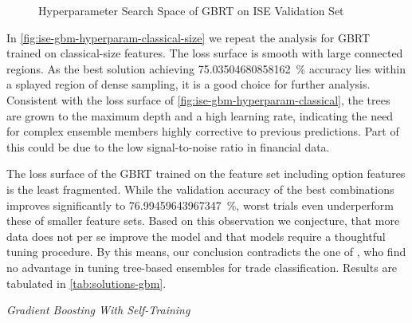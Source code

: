 \begin{figure}[!b]
    \vfill
\end{figure}
\clearpage
\begin{figure}[ht]
    \addtocounter{figure}{-1}
    \caption[]{Hyperparameter Search Space of \gls{GBRT} on \gls{ISE} Validation Set}
    \label{fig:ise-gbm-hyperparam}
\end{figure}

In \cref{fig:ise-gbm-hyperparam-classical-size} we repeat the analysis for \gls{GBRT} trained on classical-size features. The loss surface is smooth with large connected regions. As the best solution achieving \SI{75.03504680858162}{\percent} accuracy lies within a splayed region of dense sampling, it is a good choice for further analysis. Consistent with the loss surface of \cref{fig:ise-gbm-hyperparam-classical}, the trees are grown to the maximum depth and a high learning rate, indicating the need for complex ensemble members highly corrective to previous predictions. Part of this could be due to the low signal-to-noise ratio in financial data.

The loss surface of the \gls{GBRT} trained on the feature set including option features is the least fragmented. While the validation accuracy of the best combinations improves significantly to \SI{76.99459643967347}{\percent}, worst trials even underperform these of smaller feature sets. Based on this observation we conjecture, that more data does not per se improve the model and that models require a thoughtful tuning procedure. By this means, our conclusion contradicts the one of \textcite[][14]{ronenMachineLearningTrade2022}, who find no advantage in tuning tree-based ensembles for trade classification. Results are tabulated in \cref{tab:solutions-gbm}.

\clearpage

\emph{Gradient Boosting With Self-Training}

\begin{figure}[!b]
    \vfill
\end{figure}

